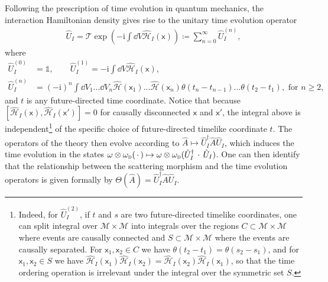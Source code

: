 \documentclass[letterpaper,12pt,titlepage,oneside,final]{book}
\newcommand{\openone}{\mathds{1}}
\newcommand{\M}{\mathcal{M}}
\newcommand{\mf}{\mathsf}%
\newcommand{\ii}{\mathrm{i}}
\newcommand{\tc}[1]{\textsc{#1}}
\begin{document}
Following the prescription of time evolution in quantum mechanics, the interaction Hamiltonian density gives rise to the unitary time evolution operator
\begin{align}\label{eq:Texp}
    \hat{U}_I = \mathcal{T}\exp\left(- \ii \int \dd V \hat{\mathcal{H}}_I(\mf x)\right)\coloneqq \sum_{n=0}^\infty \hat{U}_I^{(n)},
\end{align}
where
\begin{align}
    \hat{U}_I^{(0)} &= \openone,\quad\quad
    \hat{U}_I^{(1)} = - \ii \int \dd V \hat{\mathcal{H}}_I(\mf x),\label{eq:UI1FV}\\
    \hat{U}_I^{(n)} &= (-\ii)^n \int \dd V_1 ... \dd V_n \hat{\mathcal{H}}(\mf x_1)...\hat{\mathcal{H}}(\mf x_n) \theta(t_n - t_{n-1})...\theta(t_2 - t_{1}), \text{ for } n\geq 2,
\end{align}
and $t$ is any future-directed time coordinate. Notice that because $[\hat{\mathcal{H}}_I(\mf x), \hat{\mathcal{H}}_I(\mf x')] = 0$ for causally disconnected $\mf x$ and $\mf x'$, the integral above is independent\footnote{Indeed, for $\hat{U}_I^{(2)}$, if $t$ and $s$ are two future-directed timelike coordinates, one can split integral over $\M\times \M$ into integrals over the regions $C\subset\M\times \M$ where events are causally connected and $S\subset\M\times\M$ where the events are causally separated. For $\mf x_1,\mf x_2\in C$ we have $\theta(t_2-t_1) = \theta(s_2-s_1)$, and for $\mf x_1, \mf x_2\in S$ we have $\hat{\mathcal{H}}_I(\mf x_1)\hat{\mathcal{H}}_I(\mf x_2) = \hat{\mathcal{H}}_I(\mf x_2)\hat{\mathcal{H}}_I(\mf x_1)$, so that the time ordering operation is irrelevant under the integral over the symmetric set $S$.} of the specific choice of future-directed timelike coordinate $t$. The operators of the theory then evolve according to $\hat{A} \mapsto \hat{U}_I^\dagger \hat{A} \hat{U}_I$, which induces the time evolution in the states $\omega\otimes\omega_\tc{d}(\,\cdot\,) \mapsto \omega\otimes\omega_\tc{d}(\hat{U}_I^\dagger \, \cdot \, \hat{U}_I)$. One can then identify that the relationship between the scattering morphism and the time evolution operators is given formally by $\Theta(\hat{A}) = \hat{U}_I^\dagger \hat{A} \hat{U}_I$.
\end{document}
